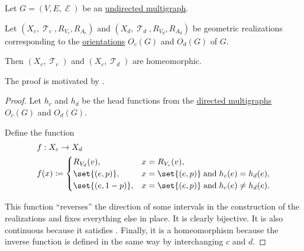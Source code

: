 \begin{proposition}\label{thm:undirected_multigraph_geometric_realizations_homeomorphic}
  Let \( G = (V, E, \mscrE) \) be an \hyperref[def:undirected_multigraph]{undirected multigraph}.

  Let \( (X_c, \mscrT_c, R_{V_c}, R_{A_c}) \) and \( (X_d, \mscrT_d, R_{V_d}, R_{A_d}) \) be geometric realizations corresponding to the \hyperref[def:multigraph_orientation]{orientations} \( O_c(G) \) and \( O_d(G) \) of \( G \).

  Then \( (X_c, \mscrT_c) \) and \( (X_c, \mscrT_d) \) are homeomorphic.
\end{proposition}
\begin{comments}
  \item The proof is motivated by .
\end{comments}
\begin{proof}
  Let \( h_c \) and \( h_d \) be the head functions from the \hyperref[def:directed_multigraph]{directed multigraphs} \( O_c(G) \) and \( O_d(G) \).

  Define the function
  \begin{equation*}
    \begin{aligned}
      &f: X_c \to X_d \\
      &f(x) \coloneqq \begin{cases}
        R_{V_d}(v),         &x = R_{V_c}(v), \\
        \set{ (e, p) },     &x = \set{ (e, p) } \T{and} h_c(e) = h_d(e), \\
        \set{ (e, 1 - p) }, &x = \set{ (e, p) } \T{and} h_c(e) \neq h_d(e).
      \end{cases}
    \end{aligned}
  \end{equation*}

  This function \enquote{reverses} the direction of some intervals in the construction of the realizations and fixes everything else in place. It is clearly bijective. It is also continuous because it satisfies . Finally, it is a homeomorphism because the inverse function is defined in the same way by interchanging \( c \) and \( d \).
\end{proof}

